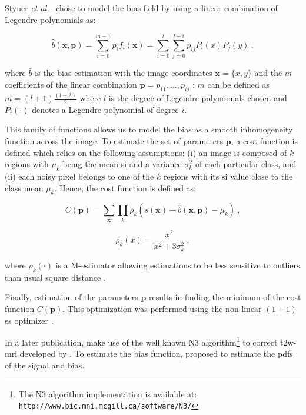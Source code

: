{\color{blue}
Styner \textit{et al.}~\cite{Styner2000} chose to model the bias field by using a linear combination of Legendre polynomials as:

\begin{equation}
	\hat{b}(\mathbf{x},\mathbf{p}) = \sum_{i=0}^{m-1} p_i f_i(\mathbf{x}) =  \sum_{i=0}^{l} \sum_{j=0}^{l-i} p_{ij} P_i(x) P_j(y) \ ,
	\label{eq:biascorr}
\end{equation}

\noindent where $\hat{b}$ is the bias estimation with the image coordinates $\mathbf{x} = \{x,y\}$ and the $m$ coefficients of the linear combination $\mathbf{p} = {p_{11},\dotsc,p_{ij}}$ ; $m$ can be defined as $m=(l+1)\frac{(l+2)}{2}$ where $l$ is the degree of Legendre polynomials chosen and $P_i(\cdot)$ denotes a Legendre polynomial of degree $i$.

This family of functions allows us to model the bias as a smooth inhomogeneity function across the image.
To estimate the set of parameters $\mathbf{p}$, a cost function is defined which relies on the following assumptions: (i) an image is composed of $k$ regions with $\mu_k$ being the mean \ac{si} and a variance $\sigma^{2}_{k}$ of each particular class, and (ii) each noisy pixel belongs to one of the $k$ regions with its \ac{si} value close to the class mean $\mu_k$.
Hence, the cost function is defined as:

\begin{equation}
	C(\mathbf{p}) = \sum_{\mathbf{x}} \prod_{k} \rho_k(s(\mathbf{x}) - \hat{b}(\mathbf{x},\mathbf{p}) - \mu_k) \ ,
	\label{eq:costbias}
\end{equation}

\begin{equation}
	\rho_k(x) = \frac{x^2}{x^2 + 3 \sigma_k^2} \ ,
	\label{eq:mestbias}
\end{equation}

\noindent where $\rho_k(\cdot)$ is a M-estimator allowing estimations to be less sensitive to outliers than usual square distance \cite{Li1996}.

Finally, estimation of the parameters $\mathbf{p}$ results in finding the minimum of the cost function $C(\mathbf{p})$.
This optimization was performed using the non-linear $(1+1)$ \ac{es} optimizer \cite{Styner1997}.

In a later publication, \cite{Viswanath2012} make use of the well known N3 algorithm\footnote{The N3 algorithm implementation is available at: \texttt{http://www.bic.mni.mcgill.ca/\allowbreak software/N3/}} to correct \ac{t2w}-\ac{mri} developed by \cite{Sled1998}.
To estimate the bias function, \cite{Sled1998} proposed to estimate the \acp{pdf} of the signal and bias.

}
